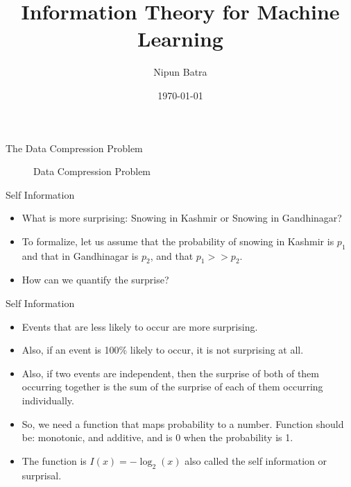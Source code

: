 \documentclass[handout]{beamer}
\begin{document}
\title{Information Theory for Machine Learning}
\author{Nipun Batra}
\date{\today}
\maketitle


\begin{frame}{The Data Compression Problem}
    \begin{figure}[h]
        \centering
        \caption{Data Compression Problem}
      \end{figure}
    
\end{frame}


\begin{frame}{Self Information}
\begin{itemize}
    \item What is more surprising: Snowing in Kashmir or Snowing in Gandhinagar?
    \item To formalize, let us assume that the probability of snowing in Kashmir is $p_1$ and that in Gandhinagar is $p_2$, and that $p_1 >> p_2$.
    \item How can we quantify the surprise?
\end{itemize}
\end{frame}

\begin{frame}{Self Information}
    \begin{itemize}
        \item Events that are less likely to occur are more surprising.
        \item Also, if an event is 100\% likely to occur, it is not surprising at all.
        \item Also, if two events are independent, then the surprise of both of them occurring together is the sum of the surprise of each of them occurring individually.
        \item So, we need a function that maps probability to a number. Function  should be: monotonic, and additive, and is 0 when the probability is 1.
        \item The function is $I(x) = -\log_2(x)$ also called the self information or surprisal.
    \end{itemize}
    \end{frame}
\end{document}
